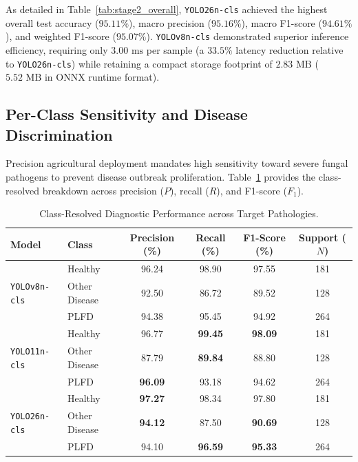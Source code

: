 As detailed in Table~\ref{tab:stage2_overall}, \texttt{YOLO26n-cls} achieved the highest overall test accuracy ($95.11\%$), macro precision ($95.16\%$), macro F1-score ($94.61\%$), and weighted F1-score ($95.07\%$). \texttt{YOLOv8n-cls} demonstrated superior inference efficiency, requiring only $3.00\text{ ms}$ per sample (a $33.5\%$ latency reduction relative to \texttt{YOLO26n-cls}) while retaining a compact storage footprint of $2.83\text{ MB}$ ($5.52\text{ MB}$ in ONNX runtime format).

\subsection{Per-Class Sensitivity and Disease Discrimination}
\label{subsec:per_class}

Precision agricultural deployment mandates high sensitivity toward severe fungal pathogens to prevent disease outbreak proliferation. Table~\ref{tab:stage2_per_class} provides the class-resolved breakdown across precision ($P$), recall ($R$), and F1-score ($F_1$).

\begin{table}[htbp]
\centering
\caption{Class-Resolved Diagnostic Performance across Target Pathologies.}
\label{tab:stage2_per_class}
\begin{tabular}{llcccc}
\toprule
\textbf{Model} & \textbf{Class} & \textbf{Precision (\%)} & \textbf{Recall (\%)} & \textbf{F1-Score (\%)} & \textbf{Support ($N$)} \\
\midrule
\multirow{3}{*}{\texttt{YOLOv8n-cls}} 
  & Healthy        & 96.24 & 98.90 & 97.55 & 181 \\
  & Other Disease  & 92.50 & 86.72 & 89.52 & 128 \\
  & PLFD           & 94.38 & 95.45 & 94.92 & 264 \\
\midrule
\multirow{3}{*}{\texttt{YOLO11n-cls}} 
  & Healthy        & 96.77 & \textbf{99.45} & \textbf{98.09} & 181 \\
  & Other Disease  & 87.79 & \textbf{89.84} & 88.80 & 128 \\
  & PLFD           & \textbf{96.09} & 93.18 & 94.62 & 264 \\
\midrule
\multirow{3}{*}{\texttt{YOLO26n-cls}} 
  & Healthy        & \textbf{97.27} & 98.34 & 97.80 & 181 \\
  & Other Disease  & \textbf{94.12} & 87.50 & \textbf{90.69} & 128 \\
  & PLFD           & 94.10 & \textbf{96.59} & \textbf{95.33} & 264 \\
\bottomrule
\end{tabular}
\end{table}

